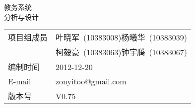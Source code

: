 \begin{titlepage}
  \vspace*{\fill}
  \begin{center}
    \fontsize{50pt}{12pt}
    教务系统\\\vspace{2ex} \fontsize{40pt}{12pt}分析与设计\\\vspace{40ex}
    \Large 
    \begin{tabular}{ll}
      项目组成员 & 叶晓军~(10383008)\quad 杨曦华~(10383039)\\
      & 柯毅豪~(10383063)\quad 钟宇腾~(10383067)\\
      编制时间 & 2012-12-20\\
      E-mail & zonyitoo@gmail.com\\
      版本号 & V0.75
    \end{tabular}
  \end{center}
  \vspace*{\fill}
\end{titlepage}

